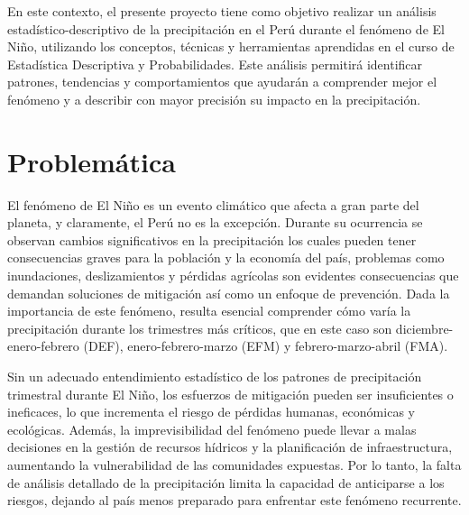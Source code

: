 \documentclass{article}
\begin{document}
En este contexto, el presente proyecto tiene como objetivo realizar un análisis estadístico-descriptivo de la precipitación en el Perú durante el fenómeno de El Niño, utilizando los conceptos, técnicas y herramientas aprendidas en el curso de Estadística Descriptiva y Probabilidades. Este análisis permitirá identificar patrones, tendencias y comportamientos que ayudarán a comprender mejor el fenómeno y a describir con mayor precisión su impacto en la precipitación.
\vspace*{\fill}

\newpage

\section{Problemática}

El fenómeno de El Niño es un evento climático que afecta a gran parte del planeta, y claramente, el Perú no es la excepción. Durante su ocurrencia se observan cambios significativos en la precipitación los cuales pueden tener consecuencias graves para la población y la economía del país, problemas como inundaciones, deslizamientos y pérdidas agrícolas son evidentes consecuencias que demandan soluciones de mitigación así como un enfoque de prevención. Dada la importancia de este fenómeno, resulta esencial comprender cómo varía la precipitación durante los trimestres más críticos, que en este caso son diciembre-enero-febrero (DEF), enero-febrero-marzo (EFM) y febrero-marzo-abril (FMA).

Sin un adecuado entendimiento estadístico de los patrones de precipitación trimestral durante El Niño, los esfuerzos de mitigación pueden ser insuficientes o ineficaces, lo que incrementa el riesgo de pérdidas humanas, económicas y ecológicas. Además, la imprevisibilidad del fenómeno puede llevar a malas decisiones en la gestión de recursos hídricos y la planificación de infraestructura, aumentando la vulnerabilidad de las comunidades expuestas. Por lo tanto, la falta de análisis detallado de la precipitación limita la capacidad de anticiparse a los riesgos, dejando al país menos preparado para enfrentar este fenómeno recurrente.
\end{document}
